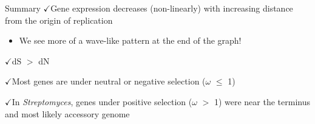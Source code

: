 \documentclass{beamer}
\makeatletter
\newcommand{\bi}{\begin{itemize}}
\newcommand{\ei}{\end{itemize}}
\newcommand{\itm}{\item<itm@1->}
\newcommand{\strep}{\textit{Streptomyces}\xspace}
\newcommand{\ch}{$\checkmark$}
\newcommand\FourQuad[4]{%
	\begin{minipage}[b][.35\textheight][t]{.47\textwidth}#1\end{minipage}\hfill%
	\begin{minipage}[b][.35\textheight][t]{.47\textwidth}#2\end{minipage}\\[0.5em]
	\begin{minipage}[b][.35\textheight][t]{.47\textwidth}#3\end{minipage}\hfill
	\begin{minipage}[b][.35\textheight][t]{.47\textwidth}#4\end{minipage}%
}
\makeatother
\begin{document}
\begin{frame}{Summary}
	\ch Gene expression decreases (non-linearly) with increasing distance from the origin of replication
	\bi
	\itm  We see more of a wave-like pattern at the end of the graph!
	\ei

	\ch dS $>$ dN

	\ch Most genes are under neutral or negative selection ($\omega$ $\le$ 1)

	\ch In \strep, genes under positive selection ($\omega$ $>$ 1) were near the terminus and most likely accessory genome
\end{frame}
%
%		
%
%
%		
%
\end{document}
